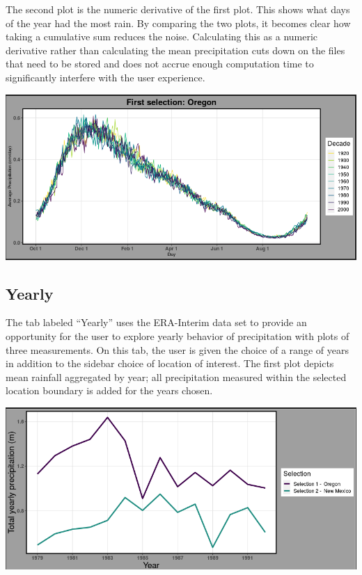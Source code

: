 \documentclass[10pt,letterpaper]{article}
\begin{document}
The second plot is the numeric derivative of the first plot. This shows what days of the year had the most rain. By comparing the two plots, it becomes clear how taking a cumulative sum reduces the noise. Calculating this as a numeric derivative rather than calculating the mean precipitation cuts down on the files that need to be stored and does not accrue enough computation time to significantly interfere with the user experience.

\begin{center}
  \includegraphics[width = .8\textwidth]{graphics/derivative}
\end{center}

\subsection*{Yearly}

The tab labeled “Yearly” uses the ERA-Interim data set to provide an opportunity for the user to explore yearly behavior of precipitation with plots of three measurements. On this tab, the user is given the choice of a range of years in addition to the sidebar choice of location of interest. The first plot depicts mean rainfall aggregated by year; all precipitation measured within the selected location boundary is added for the years chosen.

\begin{center}
  \includegraphics[width = .8\textwidth]{graphics/total}
\end{center}
\end{document}
